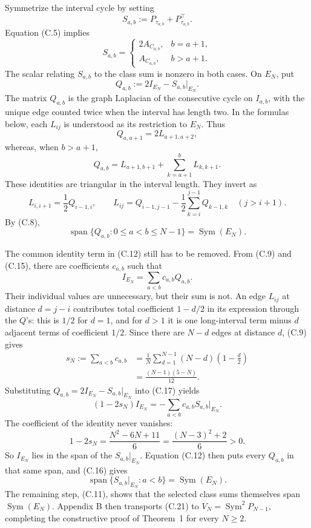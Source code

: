 \documentclass[11pt]{article}
\begin{document}
Symmetrize the interval cycle by setting \[ S_{a,b}:=P_{\tau_{a,b}}+P_{\tau_{a,b}}^\top. \tag{C.10} \] Equation (C.5) implies \[ S_{a,b} =\begin{cases} 2A_{C_{a,b}},&b=a+1,\\ A_{C_{a,b}},&b>a+1. \end{cases} \tag{C.11} \] The scalar relating \(S_{a,b}\) to the class sum is nonzero in both cases. On \(E_N\), put \[ Q_{a,b}:=2I_{E_N}-S_{a,b}|_{E_N}. \tag{C.12} \] The matrix \(Q_{a,b}\) is the graph Laplacian of the consecutive cycle on \(I_{a,b}\), with the unique edge counted twice when the interval has length two. In the formulas below, each \(L_{ij}\) is understood as its restriction to \(E_N\). Thus \[ Q_{a,a+1}=2L_{a+1,a+2}, \tag{C.13} \] whereas, when \(b>a+1\), \[ Q_{a,b} =L_{a+1,b+1}+\sum_{k=a+1}^{b}L_{k,k+1}. \tag{C.14} \] These identities are triangular in the interval length. They invert as \[ L_{i,i+1}=\frac12Q_{i-1,i}, \qquad L_{ij}=Q_{i-1,j-1} -\frac12\sum_{k=i}^{j-1}Q_{k-1,k} \quad(j>i+1). \tag{C.15} \] By (C.8), \[ \operatorname{span}\{Q_{a,b}:0\le a<b\le N-1\} =\operatorname{Sym}(E_N). \tag{C.16} \]

The common identity term in (C.12) still has to be removed. From (C.9) and (C.15), there are coefficients \(c_{a,b}\) such that \[ I_{E_N}=\sum_{a<b}c_{a,b}Q_{a,b}. \tag{C.17} \] Their individual values are unnecessary, but their sum is not. An edge \(L_{ij}\) at distance \(d=j-i\) contributes total coefficient \(1-d/2\) in its expression through the \(Q\)'s: this is \(1/2\) for \(d=1\), and for \(d>1\) it is one long-interval term minus \(d\) adjacent terms of coefficient \(1/2\). Since there are \(N-d\) edges at distance \(d\), (C.9) gives \[ \begin{aligned} s_N:=\sum_{a<b}c_{a,b} &=\frac1N\sum_{d=1}^{N-1}(N-d)\left(1-\frac d2\right)\\ &=\frac{(N-1)(5-N)}{12}. \end{aligned} \tag{C.18} \] Substituting \(Q_{a,b}=2I_{E_N}-S_{a,b}|_{E_N}\) into (C.17) yields \[ (1-2s_N)I_{E_N} =-\sum_{a<b}c_{a,b}S_{a,b}|_{E_N}. \tag{C.19} \] The coefficient of the identity never vanishes: \[ 1-2s_N =\frac{N^2-6N+11}{6} =\frac{(N-3)^2+2}{6}>0. \tag{C.20} \] So \(I_{E_N}\) lies in the span of the \(S_{a,b}|_{E_N}\). Equation (C.12) then puts every \(Q_{a,b}\) in that same span, and (C.16) gives \[ \operatorname{span}\{S_{a,b}|_{E_N}:a<b\} =\operatorname{Sym}(E_N). \tag{C.21} \] The remaining step, (C.11), shows that the selected class sums themselves span \(\operatorname{Sym}(E_N)\). Appendix B then transports (C.21) to \(V_N=\operatorname{Sym}^2P_{N-1}\), completing the constructive proof of Theorem~1 for every \(N\ge2\).
\end{document}
